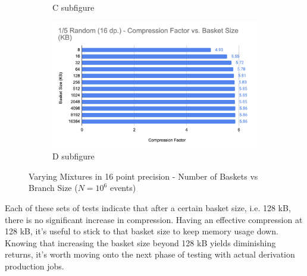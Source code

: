 \begin{figure}[h]
\begin{subfigure}{.5\textwidth}
        \caption{C subfigure}
        \label{fig:toymodel_418_compF_vs_basketsize_subC}
      \end{subfigure}%
      \begin{subfigure}{.5\textwidth}
        \centering
        \includegraphics[width=\textwidth]{content/toymodel_content/4.18/1_of_5.png}
        \caption{D subfigure}
        \label{fig:toymodel_418_compF_vs_basketsize_subD}
      \end{subfigure}%
      \caption{Varying Mixtures in 16 point precision - Number of Baskets vs Branch Size ($N=10^6$ events)}
      \label{fig:toymodel_418_compF_vs_basketsize}
\end{figure}


Each of these sets of tests indicate that after a certain basket size, i.e. 128 kB, there is no significant increase in compression. 
Having an effective compression at 128 kB, it's useful to stick to that basket size to keep memory usage down. 
Knowing that increasing the basket size beyond 128 kB yields diminishing returns, it's worth moving onto the next phase of testing with actual derivation production jobs.


